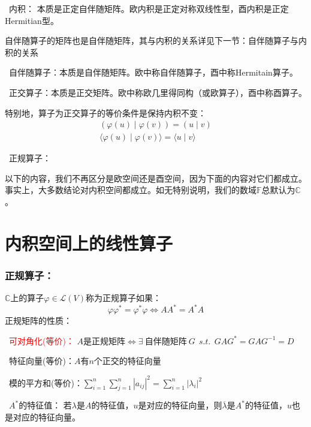 \documentclass[zihao=5,UTF8]{report}
\def\F{\mathbb{F}}
\def\C{\mathbb{C}}
\theoremstyle{mystyle} %
\begin{document}
\par{}\  内积： 本质是正定自伴随矩阵。欧内积是正定对称双线性型，酉内积是正定Hermitian型。  \par
{\par\color{gray}\small
自伴随算子的矩阵也是自伴随矩阵，其与内积的关系详见下一节：自伴随算子与内积的关系
\par}
\  自伴随算子：本质是自伴随矩阵。欧中称自伴随算子，酉中称Hermitain算子。   \par
{}\  正交算子：本质是正交矩阵。欧中称欧几里得同构（或欧算子），酉中称酉算子。\par
特别地，算子{\color{red}为正交算子的等价条件是保持内积不变}：
\begin{gather*}
    (\varphi(u) \mid \varphi(v)) = (u\mid v)\\
    \langle \varphi(u)  \mid \varphi(v) \rangle = \langle u  \mid v \rangle
\end{gather*}  \par
{}\ 正规算子：


以下的内容，我们不再区分是欧空间还是酉空间，因为下面的内容对它们都成立。事实上，大多数结论对内积空间都成立。如无特别说明，我们的数域$\F$总默认为$\C$。


\section{内积空间上的线性算子}
\subsubsection{正规算子：}
$\mathbb{C}$上的算子$\varphi \in \mathscr{L}(V)$称为正规算子如果：
\begin{equation*}
    \varphi\varphi^* = \varphi^*\varphi \Longleftrightarrow AA^* = A^*A
\end{equation*}
正规矩阵的性质：
\par{}\  \textcolor{red}{可对角化(等价)：} $A$是正规矩阵$\Longleftrightarrow \exists\ \text{自伴随矩阵}\ G \ \ s.t.\ \ GAG^* = GAG^{-1} = D $  \par
{}\ 特征向量(等价)：$A$有$n$个正交的特征向量\par
{}\ 模的平方和(等价)：$\sum_{i=1}^{n}\sum_{j=1}^{n}\left| a_{ij} \right|^2 = \sum_{i=1}^{n}\left| \lambda_i \right|^2 $\par
{}\  $A^*$的特征值： 若$\lambda$是$A$的特征值，$u$是对应的特征向量，则$\overline{\lambda}$是$A^*$的特征值，$u$也是对应的特征向量。  \par
\end{document}
